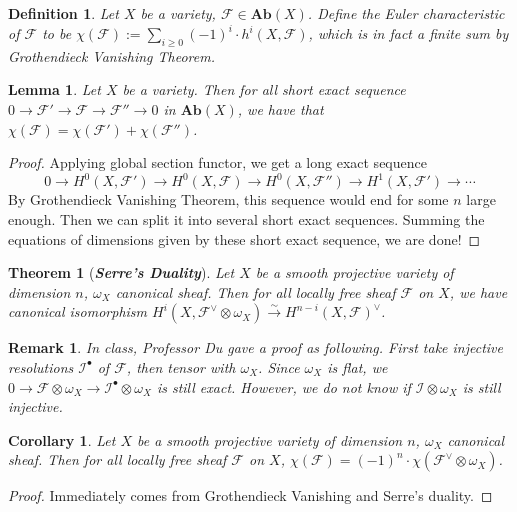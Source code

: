 \documentclass{ctexart}
\newtheorem{definition}{Definition}[section]
\newtheorem{remark}{Remark}[section]
\newtheorem{theorem}{Theorem}[section]
\newtheorem{lemma}{Lemma}[section]
\newtheorem{corollary}{Corollary}[section]
\newcommand{\abeliangroups}{\mathbf{Ab}}
\begin{document}
\begin{definition}
    Let $X$ be a variety, $\mathcal{F}\in \abeliangroups (X)$.
    Define the Euler characteristic of $\mathcal{F}$ to be $\chi(\mathcal{F}) := \sum_{i \ge 0} (-1)^{i} \cdot h^{i}(X, \mathcal{F})$,
    which is in fact a finite sum by Grothendieck Vanishing Theorem.
\end{definition}
\begin{lemma}
    Let $X$ be a variety.
    Then for all short exact sequence $0 \rightarrow \mathcal{F}' \rightarrow \mathcal{F} \rightarrow \mathcal{F}'' \rightarrow 0$ in $\abeliangroups (X)$,
    we have that $\chi(\mathcal{F}) = \chi(\mathcal{F}') + \chi(\mathcal{F}'')$.
    \label{Lemma 3.1}
\end{lemma}
\begin{proof}
    Applying global section functor, we get a long exact sequence
    \begin{equation}
        0 \rightarrow H^{0}(X, \mathcal{F}') \rightarrow H^{0}(X, \mathcal{F}) \rightarrow H^{0}(X, \mathcal{F}'') \rightarrow H^{1}(X, \mathcal{F}') \rightarrow \cdots 
    \end{equation}
    By Grothendieck Vanishing Theorem, this sequence would end for some $n$ large enough.
    Then we can split it into several short exact sequences.
    Summing the equations of dimensions given by these short exact sequence, we are done!
\end{proof}
\begin{theorem}[\textbf{\emph{Serre's Duality}}]
    Let $X$ be a smooth projective variety of dimension $n$, $\omega_{X}$ canonical sheaf.
    Then for all locally free sheaf $\mathcal{F}$ on $X$, we have canonical isomorphism $H^{i}(X, \mathcal{F}^{\vee} \otimes \omega_{X}) \overset{\sim}{\rightarrow} H^{n - i}(X, \mathcal{F})^{\vee}$.
    \label{Theorem 3.1}
\end{theorem}
\begin{remark}
    In class, Professor Du gave a proof as following.
    First take injective resolutions $\mathcal{I}^{\bullet}$ of $\mathcal{F}$, then tensor with $\omega_{X}$.
    Since $\omega_{X}$ is flat, we $0 \rightarrow \mathcal{F} \otimes \omega_{X} \rightarrow \mathcal{I}^{\bullet} \otimes \omega_{X}$ is still exact.
    However, we do not know if $\mathcal{I} \otimes \omega_{X}$ is still injective.
\end{remark}
\begin{corollary}
    Let $X$ be a smooth projective variety of dimension $n$, $\omega_{X}$ canonical sheaf.
    Then for all locally free sheaf $\mathcal{F}$ on $X$, $\chi(\mathcal{F}) = (-1)^{n} \cdot \chi(\mathcal{F}^{\vee} \otimes \omega_{X})$.
    \label{Corollary 3.1}  
\end{corollary}
\begin{proof}
    Immediately comes from Grothendieck Vanishing and Serre's duality.
\end{proof}
\end{document}
